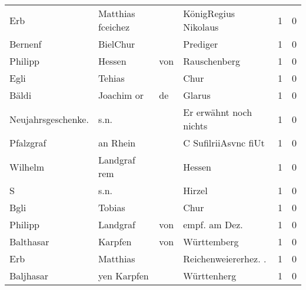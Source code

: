 \begin{tabular}{llllrr}
                      Erb &                  Matthias fceichez &             &                        KönigRegius Nikolaus &          1 &         0 \\
                  Bernenf &                           BielChur &             &                                    Prediger &          1 &         0 \\
                  Philipp &                             Hessen &         von &                                Rauschenberg &          1 &         0 \\
                     Egli &                             Tehias &             &                                        Chur &          1 &         0 \\
                    Bäldi &                         Joachim or &          de &                                      Glarus &          1 &         0 \\
       Neujahrsgeschenke. &                               s.n. &             &                      Er erwähnt noch nichts &          1 &         0 \\
                Pfalzgraf &                           an Rhein &             &                        C SufilriiAsvnc fiUt &          1 &         0 \\
                  Wilhelm &                       Landgraf rem &             &                                      Hessen &          1 &         0 \\
                        S &                               s.n. &             &                                      Hirzel &          1 &         0 \\
                     Bgli &                             Tobias &             &                                        Chur &          1 &         0 \\
                  Philipp &                           Landgraf &         von &                              empf. am Dez.  &          1 &         0 \\
                Balthasar &                            Karpfen &         von &                                 Württemberg &          1 &         0 \\
                      Erb &                           Matthias &             &                       Reichenweiererhez. .  &          1 &         0 \\
                Baljhasar &                        yen Karpfen &             &                                 Württenherg &          1 &         0 \\

\end{tabular}
